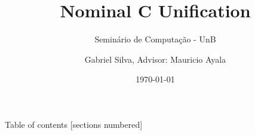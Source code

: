 \documentclass{beamer}
\title{Nominal C Unification}
\subtitle{Seminário de Computação - UnB}
\date{\today}
\author{Gabriel Silva, Advisor: Mauricio Ayala}
\institute{Department of Mathematics - University of Brasília}
\begin{document}
\maketitle

\begin{frame}{Table of contents}
    [sections numbered]
    \tableofcontents
\end{frame}

%

%
\end{document}

